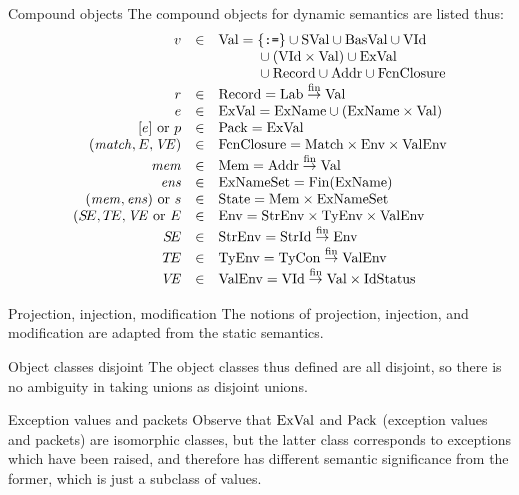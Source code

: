 \begin{definition}{Compound objects}
The compound objects for dynamic semantics are listed thus:
\begin{equation*}
\begin{array}{rcl}
        v	&\in	&{\rm Val} =\{\mbox{\tt :=}\}\cup{\rm SVal}\cup{\rm BasVal}\cup{\rm VId}\\
                &       &\qquad\quad\cup\:({\rm VId}\times{\rm Val})\cup{\rm ExVal}\\
                &       &\qquad\quad\cup\:{\rm Record}\cup{\rm Addr}\cup{\rm FcnClosure}\\
        r      & \in   & {\rm Record} =  {\rm Lab}\stackrel{{\rm fin}}{\to}{\rm Val}\\
{e}      & \in   & {\rm ExVal} = {\rm ExName} \cup ({\rm ExName}\times{\rm Val})\\
{[e]}\ {\rm or}\ p
                & \in   & {\rm Pack} = {\rm ExVal}\\
(\textit{match\/},E,\textit{V\kern-.05emE\/}) & \in   & {\rm FcnClosure} = {\rm Match}\times{\rm Env}\times{\rm ValEnv}\\
        \textit{mem\/}    & \in   & {\rm Mem} = {\rm Addr}\stackrel{{\rm fin}}{\to}{\rm Val}\\
        \textit{ens\/}   & \in   & {\rm ExNameSet} = \mathop{\rm Fin}\nolimits({\rm ExName})\\
(\textit{mem\/},\textit{ens\/})\ {\rm or}\ s
                & \in   & {\rm State} = {\rm Mem}\times{\rm ExNameSet}\\
(\mbox{$S\!E$},\mbox{$T\!E$},\textit{V\kern-.05emE\/}\ {\rm or}\ E
                & \in   & {\rm Env} = {\rm StrEnv}\times{\rm TyEnv}\times{\rm ValEnv}\\
        \mbox{$S\!E$}     & \in   & {\rm StrEnv} = {\rm StrId}\stackrel{{\rm fin}}{\to}{\rm Env}\\
        \mbox{$T\!E$}     & \in   & {\rm TyEnv} = {\rm TyCon}\stackrel{{\rm fin}}{\to}{\rm ValEnv}\\
        \textit{V\kern-.05emE\/}	& \in	& {\rm ValEnv} = {\rm VId}\stackrel{{\rm fin}}{\to}{\rm Val}\times\hbox{\rm IdStatus}
\end{array}
\end{equation*}
\end{definition}

\begin{convention}{Projection, injection, modification}
The notions of projection, injection, and modification are adapted from
the static semantics.
\end{convention}

\begin{clause}{Object classes disjoint}
The object classes thus defined are all disjoint, so there is no
ambiguity in taking unions as disjoint unions.
\end{clause}

\begin{clause}{Exception values and packets}
Observe that ${\rm ExVal}$ and ${\rm Pack}$ (exception values and packets) are
isomorphic classes, but the latter class corresponds to exceptions which
have been raised, and therefore has different semantic significance from
the former, which is just a subclass of values.
\end{clause}

